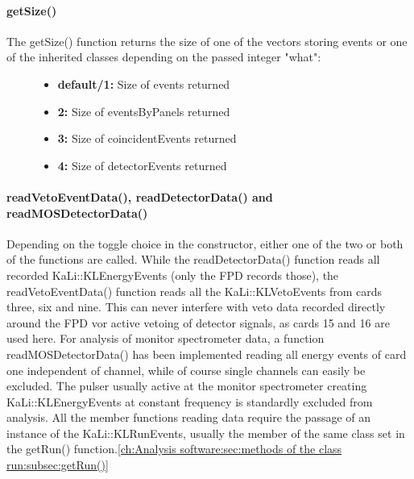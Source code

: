     \paragraph{getSize()}
    \label{ch:Analysis software:sec:methods of the class run:subsec:getSize()}
    The getSize() function returns the size of one of the vectors storing events or one of the inherited classes depending on the passed integer "what":
    \begin{figure}
    	\begin{itemize}
		
    		\item {\bf default/1:} Size of events returned
    		\item {\bf 2:} Size of eventsByPanels returned
    		\item {\bf 3:} Size of coincidentEvents returned
    		\item {\bf 4:} Size of detectorEvents returned
    	\end{itemize}

    \end{figure}

    
    \paragraph{readVetoEventData(), readDetectorData() and readMOSDetectorData()}
    \label{ch:Analysis software:sec:methods of the class run:subsec:readVetoEventData(), readDetectorData() and readMOSDetectorData()}
    Depending on the toggle choice in the constructor, either one of the two or both of the functions are called. While the readDetectorData() function reads all recorded KaLi::\-KLEnergy\-Events (only the FPD records those), the readVetoEventData() function reads all the KaLi::KLVetoEvents from cards three, six and nine. This can never interfere with veto data recorded directly around the FPD vor active vetoing of detector signals, as cards 15 and 16 are used here.
    For analysis of monitor spectrometer data, a function readMOSDetectorData() has been implemented reading all energy events of card one independent of channel, while of course single channels can easily be excluded. The pulser usually active at the monitor spectrometer creating KaLi::KLEnergyEvents at constant frequency is standardly excluded from analysis.
    All the member functions reading data require the passage of an instance of the KaLi::KLRunEvents, usually the member of the same class set in the getRun() function.\ref{ch:Analysis software:sec:methods of the class run:subsec:getRun()}

    
    
    
    
    
      